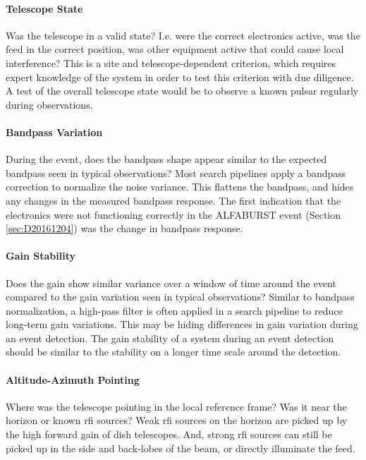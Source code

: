 \documentclass[a4paper,fleqn,usenatbib]{mnras}
\begin{document}
\paragraph{Telescope State}

Was the telescope in a valid state? I.e. were the correct electronics active,
was the feed in the correct position, was other equipment active that could
cause local interference? This is a site and telescope-dependent criterion,
which requires expert knowledge of the system in order to test this criterion
with due diligence.  A test of the overall telescope state would be to observe a
known pulsar regularly during observations.

\paragraph{Bandpass Variation}

During the event, does the bandpass shape appear similar to the expected
bandpass seen in typical observations? Most search pipelines apply a bandpass
correction to normalize the noise variance. This flattens the bandpass, and
hides any changes in the measured bandpass response. The first indication that
the electronics were not functioning correctly in the ALFABURST event (Section
\ref{sec:D20161204}) was the change in bandpass response.

\paragraph{Gain Stability}

Does the gain show similar variance over a window of time around the event
compared to the gain variation seen in typical observations? Similar to bandpass
normalization, a high-pass filter is often applied in a search pipeline to
reduce long-term gain variations. This may be hiding differences in gain
variation during an event detection. The gain stability of a system during an
event detection should be similar to the stability on a longer time scale around
the detection.

\paragraph{Altitude-Azimuth Pointing}

Where was the telescope pointing in the local reference frame? Was it near the
horizon or known \gls{rfi} sources? Weak \gls{rfi} sources on the horizon are
picked up by the high forward gain of dish telescopes. And, strong \gls{rfi}
sources can still be picked up in the side and back-lobes of the beam, or
directly illuminate the feed.
\end{document}
